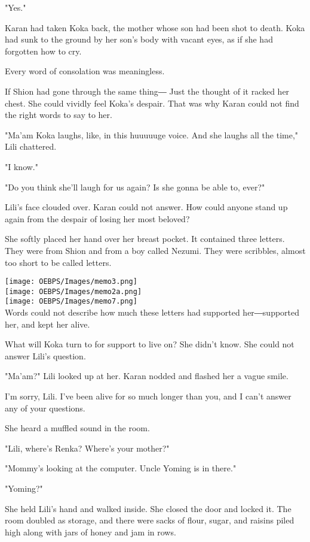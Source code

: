 "Yes."

Karan had taken Koka back, the mother whose son had been shot to death.
Koka had sunk to the ground by her son's body with vacant eyes, as if
she had forgotten how to cry.

Every word of consolation was meaningless.

If Shion had gone through the same thing― Just the thought of it racked
her chest. She could vividly feel Koka's despair. That was why Karan
could not find the right words to say to her.

"Ma'am Koka laughs, like, in this huuuuuge voice. And she laughs all the
time," Lili chattered.

"I know."

"Do you think she'll laugh for us again? Is she gonna be able to, ever?"

Lili's face clouded over. Karan could not answer. How could anyone stand
up again from the despair of losing her most beloved?

She softly placed her hand over her breast pocket. It contained three
letters. They were from Shion and from a boy called Nezumi. They were
scribbles, almost too short to be called letters.

\texttt{[image: OEBPS/Images/memo3.png]}\\

\texttt{[image: OEBPS/Images/memo2a.png]}\\

\texttt{[image: OEBPS/Images/memo7.png]}\\

Words could not describe how much these letters had supported
her―supported her, and kept her alive.

What will Koka turn to for support to live on? She didn't know. She
could not answer Lili's question.

"Ma'am?" Lili looked up at her. Karan nodded and flashed her a vague
smile.

I'm sorry, Lili. I've been alive for so much longer than you, and I
can't answer any of your questions.~

She heard a muffled sound in the room.

"Lili, where's Renka? Where's your mother?"

"Mommy's looking at the computer. Uncle Yoming is in there."

"Yoming?"

She held Lili's hand and walked inside. She closed the door and locked
it. The room doubled as storage, and there were sacks of flour, sugar,
and raisins piled high along with jars of honey and jam in rows.

